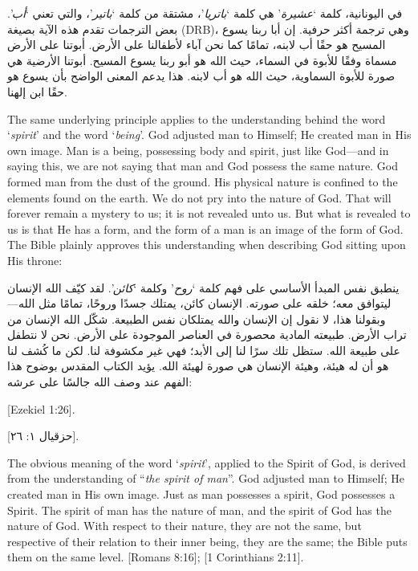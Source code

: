 في اليونانية، كلمة ‘\textit{عشيرة}’ هي كلمة ‘\textit{باتريا}’، مشتقة من كلمة ‘\textit{باتير}’، والتي تعني ‘\textit{أب}’. بعض الترجمات تقدم هذه الآية بصيغة  (DRB)، وهي ترجمة أكثر حرفية. إن أبا ربنا يسوع المسيح هو حقًا أب لابنه، تمامًا كما نحن آباء لأطفالنا على الأرض. أبوتنا على الأرض مسماة وفقًا للأبوة في السماء، حيث الله هو أبو ربنا يسوع المسيح. أبوتنا الأرضية هي صورة للأبوة السماوية، حيث الله هو أب لابنه. هذا يدعم المعنى الواضح بأن يسوع هو حقًا ابن إلهنا.


The same underlying principle applies to the understanding behind the word ‘\textit{spirit}’ and the word ‘\textit{being}’. God adjusted man to Himself; He created man in His own image. Man is a being, possessing body and spirit, just like God—and in saying this, we are not saying that man and God possess the same nature. God formed man from the dust of the ground. His physical nature is confined to the elements found on the earth. We do not pry into the nature of God. That will forever remain a mystery to us; it is not revealed unto us. But what is revealed to us is that He has a form, and the form of a man is an image of the form of God. The Bible plainly approves this understanding when describing God sitting upon His throne:


ينطبق نفس المبدأ الأساسي على فهم كلمة ‘\textit{روح}’ وكلمة ‘\textit{كائن}’. لقد كيّف الله الإنسان ليتوافق معه؛ خلقه على صورته. الإنسان كائن، يمتلك جسدًا وروحًا، تمامًا مثل الله—وبقولنا هذا، لا نقول إن الإنسان والله يمتلكان نفس الطبيعة. شكّل الله الإنسان من تراب الأرض. طبيعته المادية محصورة في العناصر الموجودة على الأرض. نحن لا نتطفل على طبيعة الله. ستظل تلك سرًا لنا إلى الأبد؛ فهي غير مكشوفة لنا. لكن ما كُشف لنا هو أن له هيئة، وهيئة الإنسان هي صورة لهيئة الله. يؤيد الكتاب المقدس بوضوح هذا الفهم عند وصف الله جالسًا على عرشه:


[Ezekiel 1:26].


[حزقيال ١: ٢٦].


The obvious meaning of the word ‘\textit{spirit}’, applied to the Spirit of God, is derived from the understanding of “\textit{the spirit of man}”. God adjusted man to Himself; He created man in His own image. Just as man possesses a spirit, God possesses a Spirit. The spirit of man has the nature of man, and the spirit of God has the nature of God. With respect to their nature, they are not the same, but respective of their relation to their inner being, they are the same; the Bible puts them on the same level. [Romans 8:16]; [1 Corinthians 2:11].


